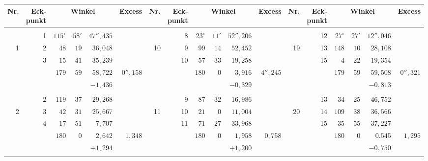 \begin{center}
\begingroup
\fontsize{7.6}{9.2}\selectfont
\setlength{\tabcolsep}{2.1pt}
\renewcommand{\arraystretch}{1.04}
\begin{tabular}{|r|r|r@{\;}r@{\;}r|r||r|r|r@{\;}r@{\;}r|r||r|r|r@{\;}r@{\;}r|r|}
\hline
Nr.&\shortstack{Eck-\\punkt}&\multicolumn{3}{c|}{Winkel}&Excess & Nr.&\shortstack{Eck-\\punkt}&\multicolumn{3}{c|}{Winkel}&Excess & Nr.&\shortstack{Eck-\\punkt}&\multicolumn{3}{c|}{Winkel}&Excess\\ \hline
 &  &  &  &  &  &  &  &  &  &  &  &  &  &  &  &  & \\
 & 1 & $115^\circ$ & $58'$ & $47''{,}435$ &  &  & 8 & $23^\circ$ & $11'$ & $52''{,}206$ &  &  & 12 & $27^\circ$ & $27'$ & $12''{,}046$ & \\
1 & 2 & $48$ & $19$ & $36{,}048$ &  & 10 & 9 & $99$ & $14$ & $52{,}452$ &  & 19 & 13 & $148$ & $10$ & $28{,}108$ & \\
 & 3 & $15$ & $41$ & $35{,}239$ &  &  & 10 & $57$ & $33$ & $19{,}258$ &  &  & 15 & $4$ & $22$ & $19{,}354$ & \\
\cline{3-5}\cline{9-11}\cline{15-17}
 &  & $179$ & $59$ & $58{,}722$ & $0''{,}158$ &  &  & $180$ & $0$ & $3{,}916$ & $4''{,}245$ &  &  & $179$ & $59$ & $59{,}508$ & $0''{,}321$\\
 &  & \multicolumn{3}{r|}{$-1{,}436$} &  &  &  & \multicolumn{3}{r|}{$-0{,}329$} &  &  &  & \multicolumn{3}{r|}{$-0{,}813$} & \\
 &  &  &  &  &  &  &  &  &  &  &  &  &  &  &  &  & \\
 & 2 & $119$ & $37$ & $29{,}268$ &  &  & 9 & $87$ & $32$ & $16{,}986$ &  &  & 13 & $34$ & $25$ & $46{,}752$ & \\
2 & 3 & $42$ & $31$ & $25{,}667$ &  & 11 & 10 & $21$ & $0$ & $11{,}004$ &  & 20 & 14 & $109$ & $38$ & $36{,}566$ & \\
 & 4 & $17$ & $51$ & $7{,}707$ &  &  & 11 & $71$ & $27$ & $33{,}968$ &  &  & 15 & $35$ & $55$ & $37{,}227$ & \\
\cline{3-5}\cline{9-11}\cline{15-17}
 &  & $180$ & $0$ & $2{,}642$ & $1{,}348$ &  &  & $180$ & $0$ & $1{,}958$ & $0{,}758$ &  &  & $180$ & $0$ & $0{.}545$ & $1{,}295$\\
 &  & \multicolumn{3}{r|}{$+1{,}294$} &  &  &  & \multicolumn{3}{r|}{$+1{,}200$} &  &  &  & \multicolumn{3}{r|}{$-0{,}750$} & \\
 &  &  &  &  &  &  &  &  &  &  &  &  &  &  &  &  & \\

\end{tabular}
\end{center}
